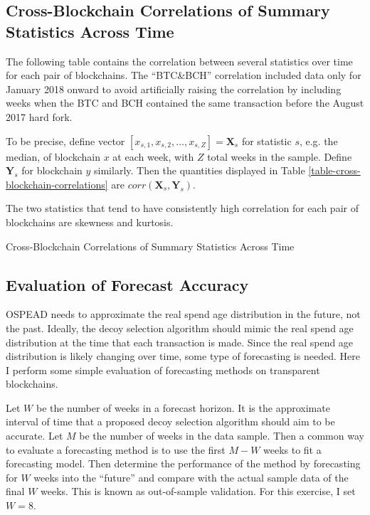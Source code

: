 \documentclass[english]{article}
\begin{document}
\subsection{Cross-Blockchain Correlations of Summary Statistics Across Time}

The following table contains the correlation between several statistics
over time for each pair of blockchains. The ``BTC\&BCH'' correlation
included data only for January 2018 onward to avoid artificially raising
the correlation by including weeks when the BTC and BCH contained
the same transaction before the August 2017 hard fork.

To be precise, define vector $[x_{s,1},x_{s,2},\ldots,x_{s,Z}]=\mathbf{X}_{s}$
for statistic $s$, e.g. the median, of blockchain $x$ at each week,
with $Z$ total weeks in the sample. Define $\mathbf{Y}_{s}$ for
blockchain $y$ similarly. Then the quantities displayed in Table
\ref{table-cross-blockchain-correlations} are $corr(\mathbf{X}_{s},\mathbf{Y}_{s})$.

The two statistics that tend to have consistently high correlation
for each pair of blockchains are skewness and kurtosis. 

\begin{table}[H]

\caption{Cross-Blockchain Correlations of Summary Statistics Across Time}

\label{table-cross-blockchain-correlations}


\end{table}


\subsection{Evaluation of Forecast Accuracy\label{subsec:Evaluation-of-Forecast-Accuracy}}

OSPEAD needs to approximate the real spend age  distribution in the
future, not the past. Ideally, the decoy selection algorithm should
mimic the real spend age distribution at the time that each transaction
is made. Since the real spend age distribution is likely changing
over time, some type of forecasting is needed. Here I perform some
simple evaluation of forecasting methods on transparent blockchains.

Let $W$ be the number of weeks in a forecast horizon. It is the approximate
interval of time that a proposed decoy selection algorithm should
aim to be accurate. Let $M$ be the number of weeks in the data sample.
Then a common way to evaluate a forecasting method is to use the first
$M-W$ weeks to fit a forecasting model. Then determine the performance
of the method by forecasting for $W$ weeks into the ``future''
and compare with the actual sample data of the final $W$ weeks. This
is known as out-of-sample validation. For this exercise, I set $W=8$.
\end{document}
